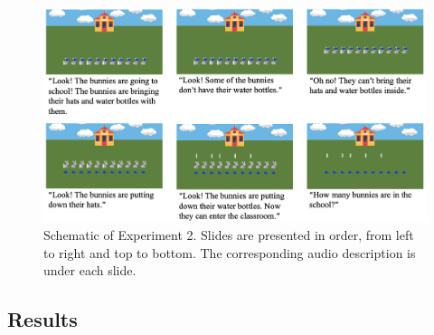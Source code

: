 \documentclass[
  man,floatsintext]{apa7}
\begin{document}
\begin{figure}[h]

{\centering \includegraphics[width=1\linewidth]{figs/exp2} 

}

\caption{Schematic of Experiment 2. Slides are presented in order, from left to right and top to bottom. The corresponding audio description is under each slide.}\label{fig:exp2-figure}
\end{figure}

\hypertarget{results-1}{%
\subsection{Results}\label{results-1}}
\end{document}
